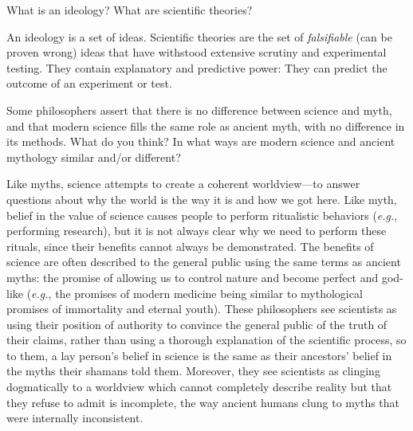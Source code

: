 \documentclass[12pt]{exam}
\begin{document}
\clearpage
\begin{questions}

\question What is an ideology? What are scientific theories?
	\begin{TheSolution}
	An ideology is a set of ideas. Scientific theories are the set of \textit{falsifiable} (can be proven wrong) ideas that have withstood extensive scrutiny and experimental testing. They contain explanatory and predictive power: They can predict the outcome of an experiment or test.
	\end{TheSolution}
	
\question
Some philosophers assert that there is no difference between science and myth, and that modern science fills the same role as ancient myth, with no difference in its methods. What do you think? In what ways are modern science and ancient mythology similar and/or different?
\begin{TheSolution}
Like myths, science attempts to create a coherent worldview---to answer questions about why the world is the way it is and how we got here. Like myth, belief in the value of science causes people to perform ritualistic behaviors (\textit{e.g.}, performing research), but it is not always clear why we need to perform these rituals, since their benefits cannot always be demonstrated. The benefits of science are often described to the general public using the same terms as ancient myths: the promise of allowing us to control nature and become perfect and god-like (\textit{e.g.}, the promises of modern medicine being similar to mythological promises of immortality and eternal youth). These philosophers see scientists as using their position of authority to convince the general public of the truth of their claims, rather than using a thorough explanation of the scientific process, so to them, a lay person's belief in science is the same as their ancestors' belief in the myths their shamans told them. Moreover, they see scientists as clinging dogmatically to a worldview which cannot completely describe reality but that they refuse to admit is incomplete, the way ancient humans clung to myths that were internally inconsistent.


\end{TheSolution}
\end{questions}
\end{document}
